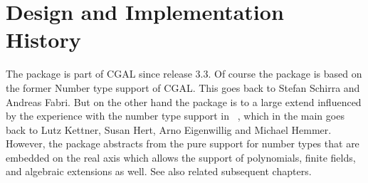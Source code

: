 \section{Design and Implementation History}

The package is part of CGAL since release 3.3. Of course the package is based 
on the former Number type support of CGAL. This goes back to Stefan Schirra and Andreas Fabri. But on the other hand the package is to a large extend influenced 
by the experience with the number type support in \exacus~\cite{beh+-eeeafcs-05}, 
which in the main goes back to 
Lutz Kettner, Susan Hert, Arno Eigenwillig and Michael Hemmer. 
However, the package abstracts from the pure support for 
number types that are embedded on the real axis which allows the support of 
polynomials, finite fields, and algebraic extensions as well. See also related 
subsequent chapters. 

